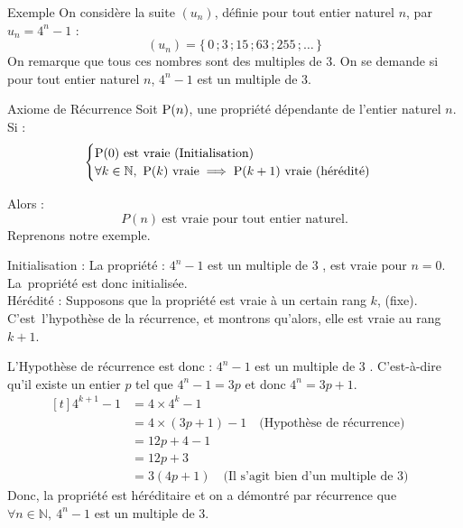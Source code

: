 \documentclass{coursbook}
\begin{document}
    \begin{Gpartie}{Exemple}
        On considère la suite $\left(u_n\right)$, définie pour tout entier naturel $n$, par $u_n=4^n-1$ :
            \[\left(u_n\right)=\big\{\,0\,; 3\,; 15\,; 63\,; 255\,; \dotso\,\big\}\]
        On remarque que tous ces nombres sont des multiples de 3. On se demande si pour tout entier naturel $n$, $4^n-1$ est un multiple de 3.
    \end{Gpartie}
    \begin{Gpartie}{Axiome de Récurrence}
        Soit $\mathrm{P}(n)$, une propriété dépendante de l'entier naturel $n$.\\
        Si :
        \[\begin{cases}
            \mathrm{P}(0)\text{ est vraie (Initialisation)} \\ \forall k\in\mathbb{N},~\mathrm{P}(k)\text{ vraie}\implies\mathrm{P}(k+1)\text{ vraie (hérédité)}
        \end{cases}\]

        Alors : \[P(n)~\text{est vraie pour tout entier naturel.}\]
        Reprenons notre exemple. 
        
        Initialisation : La propriété : \og $4^n-1$ est un multiple de 3 \fg{}, est vraie pour $n=0$. La~propriété est donc initialisée. \\ 
        Hérédité : Supposons que la propriété est vraie à un certain rang $k$, (fixe). C'est~l'hypothèse de la récurrence, et montrons qu'alors, elle est vraie au rang $k+1$.
        
        L'Hypothèse de récurrence est donc : \og $4^n-1$ est un multiple de 3 \fg{}. C'est-à-dire qu'il existe un entier $p$ tel que $4^n-1=3p$ et donc $4^n=3p+1$.
        \vspace*{-1ex}\[\begin{aligned}[t]
            4^{k+1}-1&=4\times 4^k-1 &\\
            &= 4\times\left(3p+1\right)-1 \quad \text{(Hypothèse de récurrence)} &\\
            &=12p+4-1 &\\
            &=12p+3 &\\
            &=3\left(4p+1\right) \quad \text{(Il s'agit bien d'un multiple de 3)}
        \end{aligned}\]
        Donc, la propriété est héréditaire et on a démontré par récurrence que $\forall n\in\mathbb{N},~4^n-1$ est un multiple de 3.
    \end{Gpartie}
\end{document}
